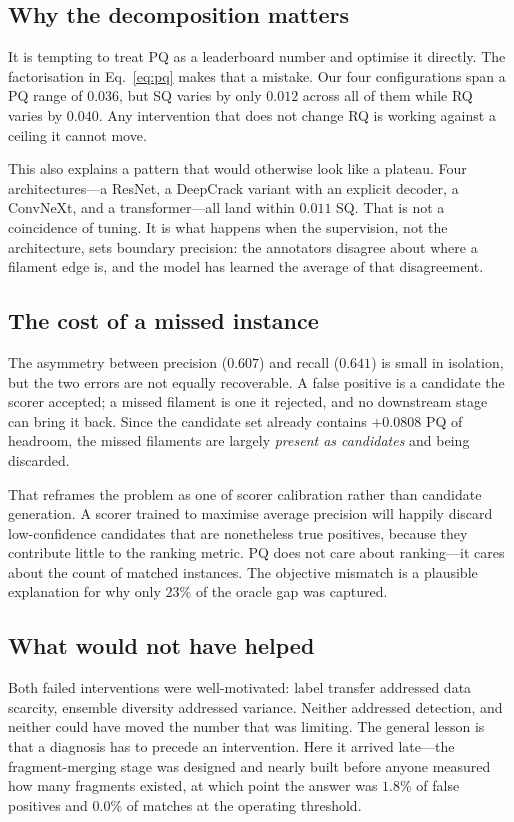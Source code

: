 \documentclass[conference]{IEEEtran}
\begin{document}
\subsection{Why the decomposition matters}

It is tempting to treat PQ as a leaderboard number and optimise it directly.
The factorisation in Eq.~\ref{eq:pq} makes that a mistake. Our four
configurations span a PQ range of $0.036$, but SQ varies by only $0.012$ across
all of them while RQ varies by $0.040$. Any intervention that does not change
RQ is working against a ceiling it cannot move.

This also explains a pattern that would otherwise look like a plateau. Four
architectures---a ResNet, a DeepCrack variant with an explicit decoder, a
ConvNeXt, and a transformer---all land within $0.011$ SQ. That is not a
coincidence of tuning. It is what happens when the supervision, not the
architecture, sets boundary precision: the annotators disagree about where a
filament edge is, and the model has learned the average of that disagreement.

\subsection{The cost of a missed instance}

The asymmetry between precision ($0.607$) and recall ($0.641$) is small in
isolation, but the two errors are not equally recoverable. A false positive is a
candidate the scorer accepted; a missed filament is one it rejected, and no
downstream stage can bring it back. Since the candidate set already contains
$+0.0808$ PQ of headroom, the missed filaments are largely \emph{present as
candidates} and being discarded.

That reframes the problem as one of scorer calibration rather than candidate
generation. A scorer trained to maximise average precision will happily discard
low-confidence candidates that are nonetheless true positives, because they
contribute little to the ranking metric. PQ does not care about ranking---it
cares about the count of matched instances. The objective mismatch is a
plausible explanation for why only $23\%$ of the oracle gap was captured.

\subsection{What would not have helped}

Both failed interventions were well-motivated: label transfer addressed data
scarcity, ensemble diversity addressed variance. Neither addressed detection,
and neither could have moved the number that was limiting. The general lesson
is that a diagnosis has to precede an intervention. Here it arrived late---the
fragment-merging stage was designed and nearly built before anyone measured how
many fragments existed, at which point the answer was $1.8\%$ of false positives
and $0.0\%$ of matches at the operating threshold.
\end{document}
